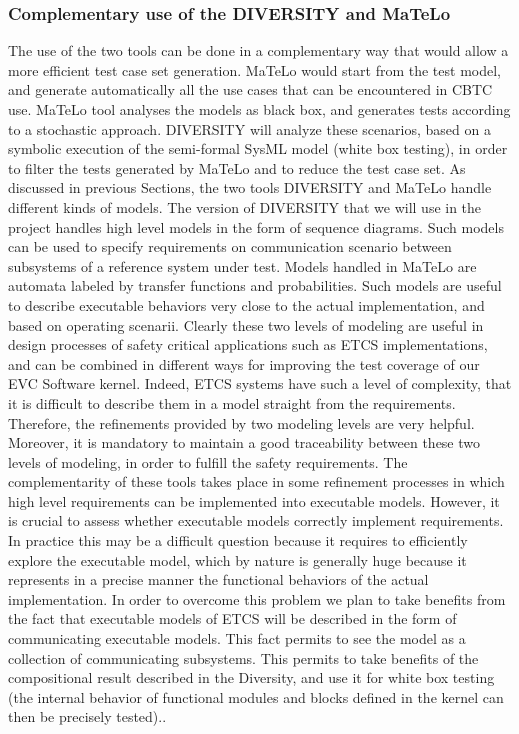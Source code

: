 \documentclass{template/openetcs_report}
\begin{document}
\subsubsection{Complementary use of the DIVERSITY and MaTeLo}
The use of the two tools can be done in a complementary way that would 
allow a more efficient test case set generation. 
MaTeLo would start from the test model, and generate automatically all the
 use cases that can be encountered in CBTC use. MaTeLo tool analyses the 
models as black box, and generates tests according to a stochastic approach. 
DIVERSITY will analyze these scenarios, based on a symbolic execution of the 
semi-formal SysML model (white box testing), in order to filter the tests generated
 by MaTeLo and to reduce the test case set.
As discussed in previous Sections, the two tools DIVERSITY and MaTeLo handle 
different kinds of models. The version of DIVERSITY that we will use in the project 
handles high level models in the form of sequence diagrams. Such models can be used 
to specify requirements on communication scenario between subsystems of a reference
 system under test. Models handled in MaTeLo are automata labeled by transfer functions
 and probabilities. Such models are useful to describe executable behaviors very close to
 the actual implementation, and based on operating scenarii. Clearly these two levels of 
modeling are useful in design processes of safety critical applications such as ETCS implementations,
 and can be combined in different ways for improving the test coverage of our EVC Software kernel.
 Indeed, ETCS systems have such a level of complexity, that it is difficult to describe them in a model
 straight from the requirements. Therefore, the refinements provided by two modeling levels are very
 helpful. Moreover, it is mandatory to maintain a good traceability between these two levels of modeling, 
in order to fulfill the safety requirements.
The complementarity of these tools takes place in some refinement processes in which high level 
requirements can be implemented into executable models. However, it is crucial to assess whether 
executable models correctly implement requirements. In practice this may be a difficult question
 because it requires to efficiently explore the executable model, which by nature is generally 
huge because it represents in a precise manner the functional behaviors of the actual implementation.
 In order to overcome this problem we plan to take benefits from the fact that executable 
models of ETCS will be described in the form of communicating executable models. This fact permits
 to see the model as a collection of communicating subsystems. This permits to take benefits of the 
compositional result described in the Diversity, and use it for white box testing (the internal behavior
 of functional modules and blocks defined in the kernel can then be precisely tested)..
\end{document}
